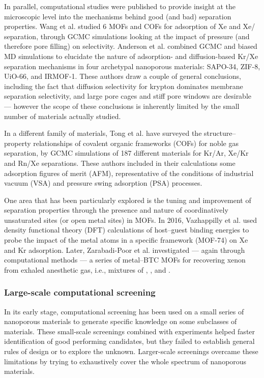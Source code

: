 \documentclass[main.tex]{subfiles}
\begin{document}
In parallel, computational studies were published to provide insight at the microscopic level into the mechanisms behind good (and bad) separation properties. Wang et al.\autocite{Wang_2014_1} studied 6 MOFs and COFs for adsorption of Xe and Xe/ separation, through GCMC simulations looking at the impact of pressure (and therefore pore filling) on selectivity. Anderson et al.\autocite{Anderson_2017} combined GCMC and biased MD simulations to elucidate the nature of adsorption- and diffusion-based Kr/Xe separation mechanisms in four archetypal nanoporous materials: SAPO-34, ZIF-8, UiO-66, and IRMOF-1. These authors draw a couple of general conclusions, including the fact that diffusion selectivity for krypton dominates membrane separation selectivity, and large pore cages and stiff pore windows are desirable --- however the scope of these conclusions is inherently limited by the small number of materials actually studied.

In a different family of materials, Tong et al.\autocite{Tong_2017} have surveyed the structure--property relationships of covalent organic frameworks (COFs) for noble gas separation, by GCMC simulations of 187 different materials for Kr/Ar, Xe/Kr and Rn/Xe separations. These authors included in their calculations some adsorption figures of merit (AFM), representative of the conditions of industrial vacuum (VSA) and pressure swing adsorption (PSA) processes.

One area that has been particularly explored is the tuning and improvement of separation properties through the presence and nature of coordinatively unsaturated sites (or open metal sites) in MOFs. In 2016, Vazhappilly et al.\autocite{Vazhappilly_2016} used density functional theory (DFT) calculations of host--guest binding energies to probe the impact of the metal atoms in a specific framework (MOF-74) on Xe and Kr adsorption. Later, Zarabadi-Poor et al.\autocite{ZarabadiPoor_2018} investigated --- again through computational methods --- a series of metal--BTC MOFs for recovering xenon from exhaled anesthetic gas, i.e., mixtures of , , and .

\subsubsection{Large-scale computational screening}

In its early stage, computational screening has been used on a small series of nanoporous materials to generate specific knowledge on some subclasses of materials. These small-scale screenings combined with experiments helped faster identification of good performing candidates, but they failed to establish general rules of design or to explore the unknown. Larger-scale screenings overcame these limitations by trying to exhaustively cover the whole spectrum of nanoporous materials.
\end{document}
